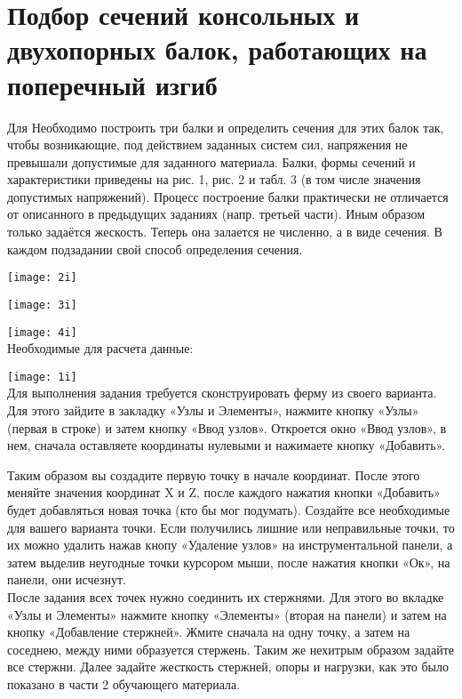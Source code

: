 \documentclass[a4paper,12pt]{article}
\begin{document}
\part*{Подбор сечений консольных и двухопорных балок, работающих на поперечный изгиб}
Для Необходимо построить три балки и определить сечения для этих балок так, чтобы возникающие, под действием заданных систем сил, напряжения не превышали допустимые для заданного материала. Балки, формы сечений и характеристики приведены на рис. 1, рис. 2 и табл. 3 (в том числе значения допустимых напряжений).
Процесс построение балки практически не отличается от описанного в предыдущих заданиях (напр. третьей части). Иным образом только задаётся жескость. Теперь она залается не численно, а в виде сечения. В каждом подзадании свой способ определения сечения.

\texttt{[image: 2i]}

\texttt{[image: 3i]}

\texttt{[image: 4i]}
\\
Необходимые для расчета данные: 

\texttt{[image: 1i]}
\\
Для выполнения задания требуется сконструировать ферму из своего варианта. \\

Для этого зайдите в закладку «Узлы и Элементы», нажмите кнопку «Узлы» 
(первая в строке) и затем кнопку «Ввод узлов». Откроется окно «Ввод узлов», 
в нем, сначала оставляете координаты нулевыми и нажимаете кнопку «Добавить». 
\begin{figure}[h]
 \center{\texttt{[image: a1]}}
 \label{ris:a1}
\end{figure}
Таким образом вы создадите первую точку в начале координат. После этого меняйте 
значения координат X и Z, после каждого нажатия кнопки «Добавить» будет 
добавляться новая точка (кто бы мог подумать).  Создайте все необходимые для 
вашего варианта точки. Если получились лишние или неправильные точки, то их 
можно удалить нажав кнопу «Удаление узлов» на инструментальной панели, а затем 
выделив неугодные точки курсором мыши, после нажатия кнопки «Ок», на панели, они исчезнут. \\

После задания всех точек нужно соединить их стержнями. Для этого во вкладке 
«Узлы и Элементы» нажмите кнопку «Элементы» (вторая на панели) и затем на 
кнопку «Добавление стержней».  Жмите сначала на одну точку, а затем на 
соседнею, между ними образуется стержень. Таким же нехитрым образом задайте все стержни.
Далее задайте жесткость стержней, опоры и нагрузки, как это было показано в 
части 2 обучающего материала. \\
\end{document}
